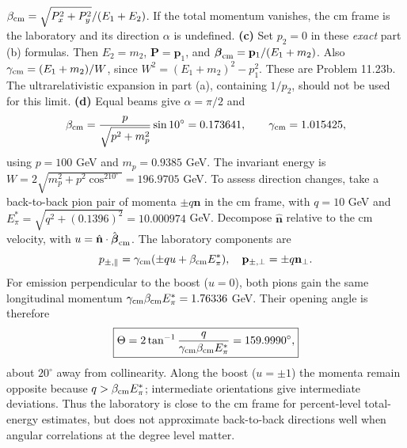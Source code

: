 $\beta_{\rm cm}=\sqrt{P_x^2+P_y^2}/(E_1+E_2)$.
If the total momentum vanishes, the cm frame is the laboratory
and its direction $\alpha$ is undefined.
\textbf{(c)} Set $p_2=0$ in these \emph{exact} part (b) formulas.
Then $E_2=m_2$, $\mathbf P=\mathbf p_1$, and
$\boldsymbol\beta_{\rm cm}=\mathbf p_1/(E_1+m_2)$.
Also $\gamma_{\rm cm}=(E_1+m_2)/W$, since
$W^2=(E_1+m_2)^2-p_1^2$. These are Problem 11.23b.
The ultrarelativistic expansion in part (a), containing $1/p_2$,
should not be used for this limit.
\textbf{(d)} Equal beams give $\alpha=\pi/2$ and
\[
\beta_{\rm cm}=\frac{p}{\sqrt{p^2+m_p^2}}\sin10^\circ
=0.173641,\qquad\gamma_{\rm cm}=1.015425,
\]
using $p=100$ GeV and $m_p=0.9385$ GeV. The invariant energy is
$W=2\sqrt{m_p^2+p^2\cos^210^\circ}=196.9705$ GeV.
To assess direction changes, take a back-to-back pion pair of
momenta $\pm q\hat{\mathbf n}$ in the cm frame, with $q=10$ GeV
and $E_\pi^*=\sqrt{q^2+(0.1396)^2}=10.000974$ GeV.
Decompose $\hat{\mathbf n}$ relative to the cm velocity, with
$u=\hat{\mathbf n}\cdot\hat{\boldsymbol\beta}_{\rm cm}$. The
laboratory components are
\[
p_{\pm,\parallel}=\gamma_{\rm cm}(\pm qu+\beta_{\rm cm}E_\pi^*),
\quad\mathbf p_{\pm,\perp}=\pm q\mathbf n_\perp.
\]
For emission perpendicular to the boost ($u=0$), both pions gain
the same longitudinal momentum
$\gamma_{\rm cm}\beta_{\rm cm}E_\pi^*=1.76336$ GeV. Their
opening angle is therefore
\[
\boxed{\Theta=2\tan^{-1}\frac{q}{\gamma_{\rm cm}\beta_{\rm cm}E_\pi^*}
=159.9990^\circ,}
\]
about $20^\circ$ away from collinearity. Along the boost ($u=\pm1$)
the momenta remain opposite because $q>\beta_{\rm cm}E_\pi^*$;
intermediate orientations give intermediate deviations. Thus the
laboratory is close to the cm frame for percent-level total-energy
estimates, but does not approximate back-to-back directions well
when angular correlations at the degree level matter.

